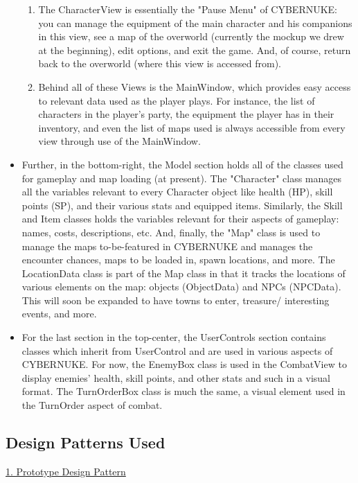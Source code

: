 \documentclass[10pt,conference,onecolumn,compsoc]{IEEEtran}
\begin{document}
\begin{itemize}
\begin{enumerate}
	\item The CharacterView is essentially the "Pause Menu" of CYBERNUKE: you can manage the equipment of the main character and his companions in this view, see a map of the overworld (currently the mockup we drew at the beginning), edit options, and exit the game. And, of course, return back to the overworld (where this view is accessed from). 

	\item Behind all of these Views is the MainWindow, which provides easy access to relevant data used as the player plays. For instance, the list of characters in the player's party, the equipment the player has in their inventory, and even the list of maps used is always accessible from every view through use of the MainWindow.

	\end{enumerate} 

\item Further, in the bottom-right, the Model section holds all of the classes used for gameplay and map loading (at present). The "Character" class manages all the variables relevant to every Character object like health (HP), skill points (SP), and their various stats and equipped items. Similarly, the Skill and Item classes holds the variables relevant for their aspects of gameplay: names, costs, descriptions, etc. And, finally, the "Map" class is used to manage the maps to-be-featured in CYBERNUKE and manages the encounter chances, maps to be loaded in, spawn locations, and more. The LocationData class is part of the Map class in that it tracks the locations of various elements on the map: objects (ObjectData) and NPCs (NPCData). This will soon be expanded to have towns to enter, treasure/ interesting events, and more.

\item For the last section in the top-center, the UserControls section contains classes which inherit from UserControl and are used in various aspects of CYBERNUKE. For now, the EnemyBox class is used in the CombatView to display enemies' health, skill points, and other stats and such in a visual format. The TurnOrderBox class is much the same, a visual element used in the TurnOrder aspect of combat.

\end{itemize}



\subsection{Design Patterns Used}
\underline{1. Prototype Design Pattern}
\vspace{5px}
\end{document}
